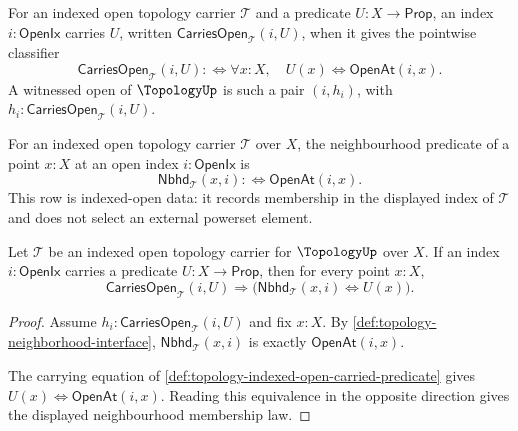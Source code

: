 \begin{definition}
\label{def:topology-indexed-open-carried-predicate}
For an indexed open topology carrier $\mathcal{T}$ and a predicate $U:X\to\mathsf{Prop}$, an index $i:\mathsf{OpenIx}$ carries $U$, written $\mathsf{CarriesOpen}_{\mathcal{T}}(i,U)$, when it gives the pointwise classifier
$$
\mathsf{CarriesOpen}_{\mathcal{T}}(i,U)
:\Longleftrightarrow
\forall x:X,\quad U(x)\Longleftrightarrow\mathsf{OpenAt}(i,x).
$$
A witnessed open of $\TopologyUp$ is such a pair $(i,h_i)$, with $h_i:\mathsf{CarriesOpen}_{\mathcal{T}}(i,U)$.
\end{definition}

\begin{definition}
\label{def:topology-neighborhood-interface}
For an indexed open topology carrier $\mathcal{T}$ over $X$, the neighbourhood predicate of a point $x:X$ at an open index $i:\mathsf{OpenIx}$ is
$$
\mathsf{Nbhd}_{\mathcal{T}}(x,i)
:\Longleftrightarrow
\mathsf{OpenAt}(i,x).
$$
This row is indexed-open data: it records membership in the displayed index of $\mathcal{T}$ and does not select an external powerset element.
\end{definition}

\begin{theorem}
\label{thm:topology-neighborhood-open-membership}
Let $\mathcal{T}$ be an indexed open topology carrier for $\TopologyUp$ over $X$. If an index $i:\mathsf{OpenIx}$ carries a predicate $U:X\to\mathsf{Prop}$, then for every point $x:X$,
$$
\mathsf{CarriesOpen}_{\mathcal{T}}(i,U)
\Longrightarrow
\bigl(\mathsf{Nbhd}_{\mathcal{T}}(x,i)\Longleftrightarrow U(x)\bigr).
$$
\end{theorem}
\begin{proof}
Assume $h_i:\mathsf{CarriesOpen}_{\mathcal{T}}(i,U)$ and fix $x:X$. By \autoref{def:topology-neighborhood-interface}, $\mathsf{Nbhd}_{\mathcal{T}}(x,i)$ is exactly $\mathsf{OpenAt}(i,x)$.

The carrying equation of \autoref{def:topology-indexed-open-carried-predicate} gives $U(x)\Longleftrightarrow\mathsf{OpenAt}(i,x)$. Reading this equivalence in the opposite direction gives the displayed neighbourhood membership law.
\end{proof}

